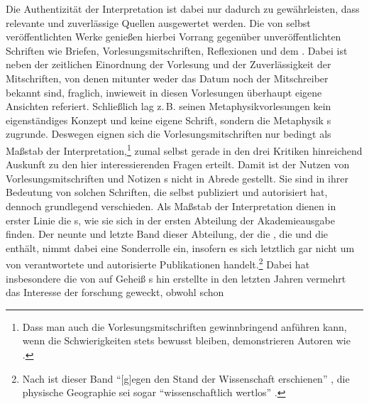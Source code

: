 Die Authentizität der Interpretation ist dabei nur dadurch zu gewährleisten,
dass relevante und zuverlässige Quellen ausgewertet werden. Die von  selbst
veröffentlichten Werke genießen hierbei Vorrang
gegenüber unveröffentlichten Schriften wie Briefen, Vorlesungsmitschriften,
Reflexionen und dem . Dabei ist neben der zeitlichen
Einordnung der Vorlesung und der Zuverlässigkeit der Mitschriften, von denen mitunter weder
das Datum noch der Mitschreiber bekannt sind, fraglich, inwieweit  in diesen
Vorlesungen überhaupt eigene Ansichten referiert. Schließlich lag z.\,B.
seinen Metaphysikvorlesungen kein eigenständiges Konzept und keine eigene
Schrift, sondern die Metaphysik
s zugrunde. Deswegen eignen
sich die Vorlesungsmitschriften nur bedingt als Maßstab der
Interpretation,\footnote{Dass man auch die Vorlesungsmitschriften gewinnbringend
anführen kann, wenn die Schwierigkeiten stets bewusst bleiben, demonstrieren
Autoren wie
\textcite[vgl.][passim]{Hinske:ZwischenAufklaerungundVernunftkritik1998}.} zumal
 selbst gerade in den drei Kritiken hinreichend Auskunft zu den hier
interessierenden Fragen erteilt. Damit ist der Nutzen von Vorlesungsmitschriften
und Notizen s nicht in Abrede gestellt. Sie sind in ihrer Bedeutung von solchen
Schriften, die  selbst publiziert und autorisiert hat, dennoch
grundlegend verschieden. Als
Maßstab der Interpretation dienen in erster Linie die 
s, wie sie sich in der ersten Abteilung der
Akademieausgabe finden. Der neunte und letzte Band dieser Abteilung, der die
, die  und die 
enthält, nimmt dabei eine Sonderrolle ein, insofern es sich letztlich gar nicht
um von  verantwortete und autorisierte Publikationen
handelt.\footnote{Nach
ist dieser Band \enquote{[g]egen den Stand der Wissenschaft {\punkt}
erschienen}
\parencite[][216]{Stark:DieKant-AusgabederBerlinerAkademie--EineMusterausgabe2000},
die physische Geographie sei sogar \enquote{wissenschaftlich wertlos}
\parencite[][214]{Stark:DieKant-AusgabederBerlinerAkademie--EineMusterausgabe2000}.}
Dabei hat insbesondere die von  auf Geheiß
s hin erstellte {\jaeschelogik} in den letzten Jahren
vermehrt das Interesse der forschung geweckt, obwohl schon

